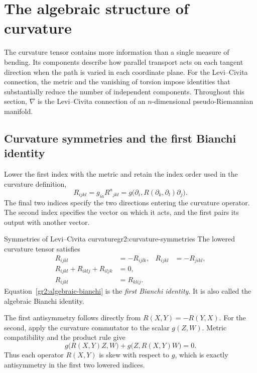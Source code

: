 \documentclass[11pt,a4paper]{article}
\numberwithin{equation}{section}
\newcommand{\slideref}[1]{\par\nobreak\smallskip\nobreak{\footnotesize\color{ink!60}\textsc{Source slide #1}}\par\nobreak\smallskip\nobreak}
\begin{document}
\section{The algebraic structure of curvature}
\label{gr2:curvature-structure}
\slideref{13}

The curvature tensor contains more information than a single measure of
bending. Its components describe how parallel transport acts on each
tangent direction when the path is varied in each coordinate plane.
For the Levi--Civita connection, the metric and the vanishing of torsion
impose identities that substantially reduce the number of independent
components. Throughout this section, \(\nabla\) is the Levi--Civita
connection of an \(n\)-dimensional pseudo-Riemannian manifold.

\subsection{Curvature symmetries and the first Bianchi identity}

Lower the first index with the metric and retain the index order used
in the curvature definition,
\begin{equation}
 R_{ijkl}=g_{ia}R^a{}_{jkl}
 =g\bigl(\partial_i,R(\partial_k,\partial_l)\partial_j\bigr).
 \label{gr2:lowered-curvature}
\end{equation}
The final two indices specify the two directions entering the curvature
operator. The second index specifies the vector on which it acts, and
the first pairs its output with another vector.

\begin{proposition}{Symmetries of Levi--Civita curvature}{gr2:curvature-symmetries}
The lowered curvature tensor satisfies
\begin{align}
 R_{ijkl}&=-R_{ijlk}, & R_{ijkl}&=-R_{jikl},
 \label{gr2:curvature-skew}\\
 R_{ijkl}+R_{iklj}+R_{iljk}&=0,
 \label{gr2:algebraic-bianchi}\\
 R_{ijkl}&=R_{klij}.
 \label{gr2:curvature-pair-symmetry}
\end{align}
Equation~\eqref{gr2:algebraic-bianchi} is the \emph{first Bianchi identity}.
It is also called the algebraic Bianchi identity.
\end{proposition}

The first antisymmetry follows directly from \(R(X,Y)=-R(Y,X)\).
For the second, apply the curvature commutator to the scalar
\(g(Z,W)\). Metric compatibility and the product rule give
\[
 g\bigl(R(X,Y)Z,W\bigr)+g\bigl(Z,R(X,Y)W\bigr)=0.
\]
Thus each operator \(R(X,Y)\) is skew with respect to \(g\), which
is exactly antisymmetry in the first two lowered indices.
\end{document}
